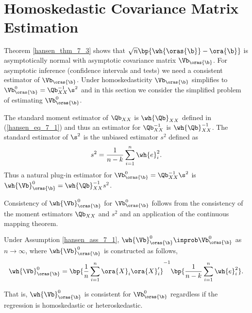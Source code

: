 \section{Homoskedastic Covariance Matrix Estimation}

Theorem \ref{hansen_thm_7_3} shows that $\sqrt{n} \bp{\wh{\oras{\b}} - \ora{\b}}$ is asymptotically normal with asymptotic covariance matrix $\Vb_{\oras{\b}}$. For asymptotic inference (confidence intervals and tests) we need a consistent estimator of $\Vb_{\oras{\b}}$. Under homoskedasticity $\Vb_{\oras{\b}}$ simplifies to $\Vb_{\oras{\b}}^0 = \Qb_{XX}^{-1}\s^2$ and in this section we consider the simplified problem of estimating $\Vb_{\oras{\b}}^0$.

The standard moment estimator of $\Qb_{XX}$ is $\wh{\Qb}_{XX}$ defined in (\ref{hansen_eq_7_1}) and thus an estimator for $\Qb_{XX}^{-1}$ is $\wh{\Qb}_{XX}^{-1}$. The standard estimator of $\s^2$ is the unbiased estimator $s^2$ defined as 
\begin{equation}
    \notag
    s^2 = \frac{1}{n-k}\sum_{i=1}^{n}\wh{e}_i^2. 
\end{equation}
Thus a natural plug-in estimator for $\Vb_{\oras{\b}}^0 = \Qb_{XX}^{-1}\s^2$ is $\wh{\Vb}_{\oras{\b}}^0 = \wh{\Qb}_{XX}^{-1}s^2$.

Consistency of $\wh{\Vb}_{\oras{\b}}^0$ for $\Vb_{\oras{\b}}^0$ follows from the consistency of the moment estimators $\Qb_{XX}$ and $s^2$ and an application of the continuous mapping theorem.

\begin{theorem}
    \label{hansen_thm_7_5}
    Under Assumption \ref{hansen_ass_7_1}, $\wh{\Vb}_{\oras{\b}}^0 \inprob \Vb_{\oras{\b}}^0$ as $n \rightarrow \infty$, where $\wh{\Vb}_{\oras{\b}}^0$ is constructed as follows,
    \begin{equation}
        \notag 
        \wh{\Vb}_{\oras{\b}}^0 = \bp{\frac{1}{n} \sum_{i=1}^{n}\ora{X}_i \ora{X}_i^\prime}^{-1} \bp{\frac{1}{n-k}\sum_{i=1}^{n}\wh{e}_i^2}.
    \end{equation}
\end{theorem}

 That is, $\wh{\Vb}_{\oras{\b}}^0$ is consistent for $\Vb_{\oras{\b}}^0$ regardless if the regression is homoskedastic or heteroskedastic. 

